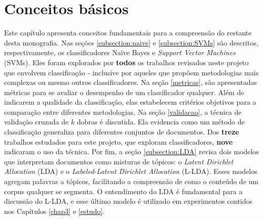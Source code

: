 \chapter{Conceitos básicos}


Este capítulo apresenta conceitos fundamentais para a compreensão do restante desta monografia. Nas seções \ref{subsection:naive} e \ref{subsection:SVMs} são descritos, respectivamente, os classificadores Naïve Bayes e \emph{Support Vector Machines} (SVMs). Eles foram explorados por \textbf{todos} os trabalhos revisados neste projeto que envolvem classificação - inclusive por aqueles que propõem metodologias mais complexas ou mesmo outros classificadores. Na seção \ref{metricas}, são apresentadas métricas para se avaliar o desempenho de um classificador qualquer. Além de indicarem a qualidade da classificação, elas estabelecem critérios objetivos para a comparação entre diferentes metodologias. Na seção \ref{validacao}, a técnica de validação cruzada de \ensuremath{k} dobras é discutida. Ela evidencia como um método de classificação generaliza para diferentes conjuntos de documentos. Dos \textbf{treze} trabalhos estudados para este projeto, que exploram classificadores, \textbf{nove} indicaram o uso da técnica. Por fim, a seção \ref{subsection:LDA} revisa dois modelos que interpretam documentos como misturas de tópicos: o \emph{Latent Dirichlet Allocation} (LDA) e o \emph{Labeled-Latent Dirichlet Allocation} (L-LDA). Esses modelos agregam palavras a tópicos, facilitando a compreensão de como o conteúdo de um corpus qualquer se segmenta. O entendimento do LDA é fundamental para a discussão do L-LDA, e esse último modelo é utilizado em experimentos contidos nos Capítulos \ref{chap3} e \ref{estudo}. 





